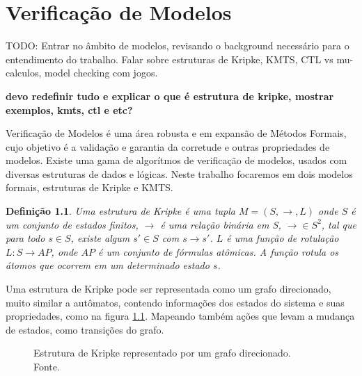 \documentclass[normaltoc,capchap,capsec,times]{abnt}
\newtheorem{definition}{Definição}[section]
\begin{document}
\chapter{Verificação de Modelos}
\label{cap:verificacao}

TODO: Entrar no âmbito de modelos, revisando o background necessário para o entendimento do trabalho. Falar sobre estruturas de Kripke, KMTS, CTL vs mu-calculos, model checking com jogos.

\textbf{devo redefinir tudo e explicar o que é estrutura de kripke, mostrar exemplos, kmts, ctl e etc?}

Verificação de Modelos é uma área robusta e em expansão de Métodos Formais, cujo objetivo é a validação e garantia da corretude e outras propriedades de modelos. Existe uma gama de algorítmos de verificação de modelos, usados com diversas estruturas de dados e lógicas. Neste trabalho focaremos em dois modelos formais, estruturas de Kripke e KMTS.

\begin{definition}
\textnormal{
Uma estrutura de Kripke é uma tupla $ M = (S, \to , L)$ onde $S$ é um conjunto de estados finitos, $\to$ é uma relação binária em S, $\to \in S^2$, tal que para todo $s \in S$, existe algum $s' \in S$ com $s \to s'$. $L$ é uma função de rotulação $L : S \to AP$, onde $AP$ é um conjunto de fórmulas atômicas. A função rotula os átomos que ocorrem em um determinado estado $s$. 
}
\end{definition}

Uma estrutura de Kripke pode ser representada como um grafo direcionado, muito similar a autômatos, contendo informações dos estados do sistema e suas propriedades, como na figura \ref{fig:ex_kripke1}. Mapeando também ações que levam a mudança de estados, como transições do grafo.

\begin{figure}[htb]
\begin{center}
\end{center}
\caption[Estrutura de Kripke representado por um grafo direcionado]{Estrutura de Kripke representado por um grafo direcionado. \\ Fonte. }
\label{fig:ex_kripke1}
\end{figure}
\end{document}
